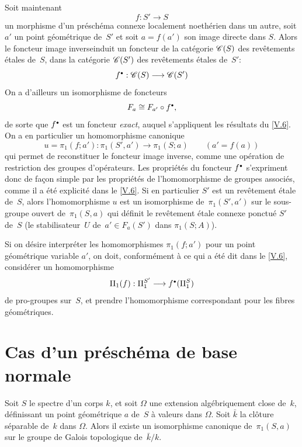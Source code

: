 Soit maintenant
$$
f\colon S'\to S
$$
un morphisme d'un pr\'esch\'ema connexe localement noeth\'erien
dans un autre, soit $a'$ un point g\'eom\'etrique de~$S'$ et soit
$a=f(a')$ son image directe dans $S$. Alors le foncteur \og image
inverse\fg induit un foncteur de la cat\'egorie $\cal{C}(S)$
\label{indnot:ei}des rev\^etements \'etales de~$S$, dans la cat\'egorie
$\cal{C}(S')$ des rev\^etements \'etales de~$S'$:
$$
f^\bbullet:\cal{C}(S)\to \cal{C}(S')
$$
On a d'ailleurs un isomorphisme de foncteurs
$$
F_a\cong F_{a'}\circ f^{\scriptscriptstyle\bullet},
$$
de sorte que $f^{\scriptscriptstyle\bullet}$ est un foncteur \emph{exact}, auquel
s'appliquent les r\'esultats du \No \ref{V.6}. On a en particulier un
homomorphisme canonique
$$
u=\pi_1(f;a'):\pi_1(S',a')\to \pi_1(S;a) \qquad (a'=f(a))
$$
\label{indnot:ej}qui permet de reconstituer le foncteur image inverse, comme une
op\'eration de restriction des groupes d'op\'erateurs. Les
propri\'et\'es du foncteur $f^{\scriptscriptstyle\bullet}$ s'expriment donc de
fa\c con simple par les propri\'et\'es de l'homomorphisme de
groupes associ\'es, comme il a \'et\'e explicit\'e dans le
\No \ref{V.6}. Si en particulier $S'$ est un rev\^etement \'etale de~$S$,
alors l'homomorphisme $u$ est un isomorphisme de~$\pi_1(S',a')$ sur le
sous-groupe ouvert de~$\pi_1(S,a)$ qui d\'efinit le rev\^etement
\'etale connexe ponctu\'e $S'$ de~$S$ (\ie le stabilisateur~$U$
de~$a'\in F_a(S')$ dans $\pi_1(S;A)$).

Si on d\'esire interpr\'eter les homomorphismes $\pi_1(f;a')$ pour
un point g\'eom\'etrique variable $a'$, on doit, conform\'ement
\`a ce qui a \'et\'e dit dans le \No \ref{V.6}, consid\'erer un
homomorphisme
$$
\Pi_1(f):\Pi_1^{S'}\to f^\bbullet(\Pi_1^S)
$$
de pro-groupes sur~$S$, et prendre l'homomorphisme correspondant pour
les fibres g\'eom\'etriques.

\section{Cas d'un pr\'esch\'ema de base normale}
\label{V.8}
\begin{proposition}
\label{V.8.1}
Soit $S$ le spectre d'un corps $k$, et soit $\Omega$ une extension
alg\'ebriquement close de~$k$, d\'efinissant un point
g\'eom\'etrique $a$ de~$S$ \`a valeurs dans $\Omega$. Soit
$\bar{k}$ la cl\^oture s\'eparable de~$k$ dans $\Omega$. Alors il
existe un isomorphisme canonique de~$\pi_1(S,a)$ sur le groupe de
Galois topologique de~$\bar{k}/k$.
\end{proposition}

